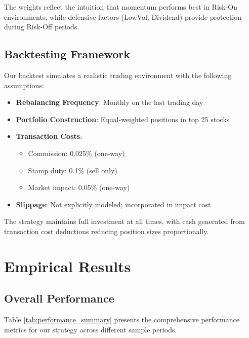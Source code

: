 \documentclass[12pt,a4paper]{article}
\begin{document}
The weights reflect the intuition that momentum performs best in Risk-On environments, while defensive factors (LowVol, Dividend) provide protection during Risk-Off periods.

\subsection{Backtesting Framework}

Our backtest simulates a realistic trading environment with the following assumptions:

\begin{itemize}
    \item \textbf{Rebalancing Frequency}: Monthly on the last trading day
    \item \textbf{Portfolio Construction}: Equal-weighted positions in top 25 stocks
    \item \textbf{Transaction Costs}:
    \begin{itemize}
        \item Commission: 0.025\% (one-way)
        \item Stamp duty: 0.1\% (sell only)
        \item Market impact: 0.05\% (one-way)
    \end{itemize}
    \item \textbf{Slippage}: Not explicitly modeled; incorporated in impact cost
\end{itemize}

The strategy maintains full investment at all times, with cash generated from transaction cost deductions reducing position sizes proportionally.

\section{Empirical Results}

\subsection{Overall Performance}

Table \ref{tab:performance_summary} presents the comprehensive performance metrics for our strategy across different sample periods.
\end{document}
